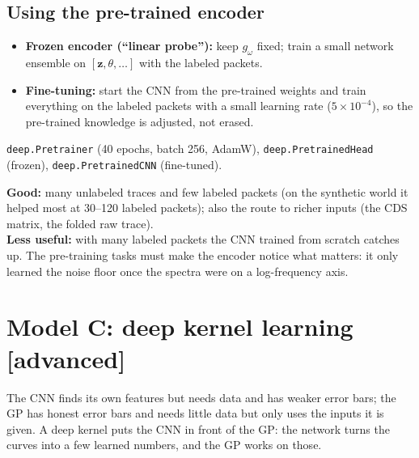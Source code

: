 \documentclass[11pt]{article}
\newcommand{\code}[1]{\texttt{#1}}
\newcommand{\level}[1]{\hfill{\normalfont\small\color{black!60}[#1]}}
\begin{document}
\subsection{Using the pre-trained encoder}
\begin{itemize}
\item \textbf{Frozen encoder (``linear probe''):} keep $g_\omega$ fixed; train a small network ensemble on $[\bm z, \theta, \dots]$
  with the labeled packets.
\item \textbf{Fine-tuning:} start the CNN from the pre-trained weights and train everything on the labeled packets with a small
  learning rate ($5\times 10^{-4}$), so the pre-trained knowledge is adjusted, not erased.
\end{itemize}

\begin{ours}
\code{deep.Pretrainer} (40 epochs, batch 256, AdamW), \code{deep.PretrainedHead} (frozen), \code{deep.PretrainedCNN}
(fine-tuned).
\end{ours}

\begin{when}
\textbf{Good:} many unlabeled traces and few labeled packets (on the synthetic world it helped most at 30--120 labeled packets);
also the route to richer inputs (the CDS matrix, the folded raw trace).\\
\textbf{Less useful:} with many labeled packets the CNN trained from scratch catches up. The pre-training tasks must make the
encoder notice what matters: it only learned the noise floor once the spectra were on a log-frequency axis.
\end{when}

\section{Model C: deep kernel learning \level{advanced}}
\label{sec:dkl}

\begin{idea}
The CNN finds its own features but needs data and has weaker error bars; the GP has honest error bars and needs little data but only
uses the inputs it is given. A deep kernel puts the CNN in front of the GP: the network turns the curves into a few learned numbers,
and the GP works on those.
\end{idea}
\end{document}
